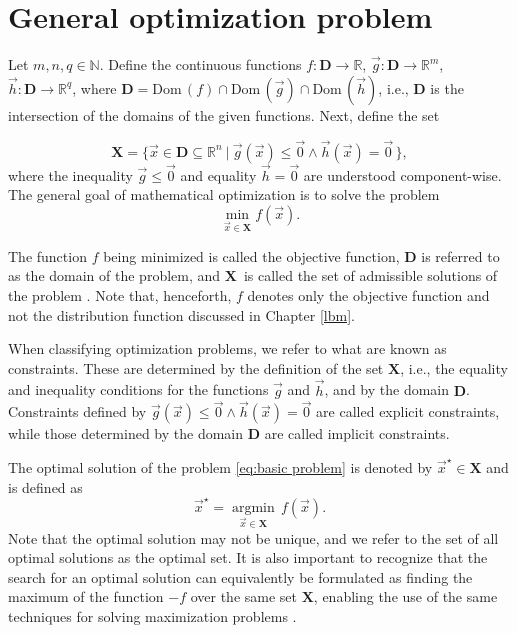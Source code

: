 \section{General optimization problem}

Let $m, n, q \in \mathbb{N}$. Define the continuous functions $f : \mathbf{D} \rightarrow \mathbb{R}$, $ \vec{g} : \mathbf{D} \rightarrow \mathbb{R}^m$, $ \vec{h} : \mathbf{D} \rightarrow \mathbb{R}^q $, where $ \mathbf{D} = \mathrm{Dom} \, (f) \cap \mathrm{Dom} \, (\vec{g}) \cap \mathrm{Dom} \, (\vec{h})$, i.e., $ \mathbf{D} $ is the intersection of the domains of the given functions. Next, define the set

\begin{equation}\label{eq:admissible solution}
	\mathbf{X} = \big\{ \vec{x} \in \mathbf{D} \subseteq \mathbb{R}^n \ | \ \vec{g} (\vec{x}) \leq \vec{0} \wedge \vec{h} (\vec{x}) = \vec{0} \, \big\},
\end{equation}
where the inequality $ \vec{g} \leq \vec{0} $ and equality $ \vec{h} = \vec{0} $ are understood component-wise. The general goal of mathematical optimization is to solve the problem
\begin{equation}\label{eq:basic problem}
	\min_{\vec{x} \in \mathbf{X}} f(\vec{x}).
\end{equation}

The function $f$ being minimized is called the objective function, $\mathbf{D}$ is referred to as the domain of the problem, and $\mathbf{X}$~is called the set of admissible solutions of the problem \cite{Bert}. Note that, henceforth, $f$ denotes only the objective function and not the distribution function discussed in Chapter \ref{lbm}.

When classifying optimization problems, we refer to what are known as constraints. These are determined by the definition of the set $ \mathbf{X} $, i.e., the equality and inequality conditions for the functions $ \vec{g} $ and $ \vec{h} $, and by the domain $ \mathbf{D} $. Constraints defined by $ \vec{g} (\vec{x}) \leq \vec{0} \wedge \vec{h} (\vec{x}) = \vec{0} $ are called explicit constraints, while those determined by the domain $ \mathbf{D} $ are called implicit constraints.

The optimal solution of the problem \eqref{eq:basic problem} is denoted by $ \vec{x}^{\star} \in \mathbf{X} $ and is defined as
\begin{equation}
	\vec{x}^{\star} = \operatorname*{argmin}_{\vec{x} \in \mathbf{X}} \, f(\vec{x}).
\end{equation}
Note that the optimal solution may not be unique, and we refer to the set of all optimal solutions as the optimal set. It is also important to recognize that the search for an optimal solution can equivalently be formulated as finding the maximum of the function $ -f$ over the same set $ \mathbf{X}$, enabling the use of the same techniques for solving maximization problems \cite{Bert, non-linear-textbook}.